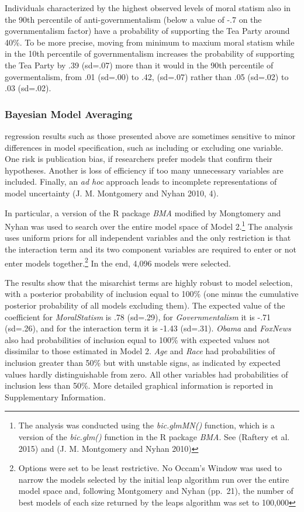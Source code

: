 \documentclass[12pt,]{article}
\let\rmarkdownfootnote\footnote%
\def\footnote{\protect\rmarkdownfootnote}
\begin{document}
Individuals characterized by the highest observed levels of moral
statism also in the 90th percentile of anti-governmentalism (below a
value of -.7 on the governmentalism factor) have a probability of
supporting the Tea Party around 40\%. To be more precise, moving from
minimum to maxium moral statism while in the 10th percentile of
governmentalism increases the probability of supporting the Tea Party by
.39 (sd=.07) more than it would in the 90th percentile of
govermentalism, from .01 (sd=.00) to .42, (sd=.07) rather than .05
(sd=.02) to .03 (sd=.02).

\clearpage

\subsubsection{Bayesian Model Averaging}\label{bayesian-model-averaging}

regression results such as those presented above are sometimes sensitive
to minor differences in model specification, such as including or
excluding one variable. One risk is publication bias, if researchers
prefer models that confirm their hypotheses. Another is loss of
efficiency if too many unnecessary variables are included. Finally, an
\emph{ad hoc} approach leads to incomplete representations of model
uncertainty (J. M. Montgomery and Nyhan 2010, 4).

In particular, a version of the R package \emph{BMA} modified by
Mongtomery and Nyhan was used to search over the entire model space of
Model 2.\footnote{The analysis was conducted using the
  \emph{bic.glmMN()} function, which is a version of the
  \emph{bic.glm()} function in the R package \emph{BMA}. See (Raftery et
  al. 2015) and (J. M. Montgomery and Nyhan 2010)} The analysis uses
uniform priors for all independent variables and the only restriction is
that the interaction term and its two component variables are required
to enter or not enter models together.\footnote{Options were set to be
  least restrictive. No Occam's Window was used to narrow the models
  selected by the initial leap algorithm run over the entire model space
  and, following Montgomery and Nyhan (pp.~21), the number of best
  models of each size returned by the leaps algorithm was set to 100,000}
In the end, 4,096 models were selected.

The results show that the misarchist terms are highly robust to model
selection, with a posterior probability of inclusion equal to 100\% (one
minus the cumulative posterior probability of all models excluding
them). The expected value of the coefficient for \emph{MoralStatism} is
.78 (sd=.29), for \emph{Governmentalism} it is -.71 (sd=.26), and for
the interaction term it is -1.43 (sd=.31). \emph{Obama} and
\emph{FoxNews} also had probabilities of inclusion equal to 100\% with
expected values not dissimilar to those estimated in Model 2. \emph{Age}
and \emph{Race} had probabilities of inclusion greater than 50\% but
with unstable signs, as indicated by expected values hardly
distinguishable from zero. All other variables had probabilities of
inclusion less than 50\%. More detailed graphical information is
reported in Supplementary Information.
\end{document}
